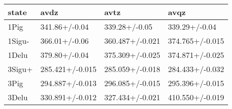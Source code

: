 \begin{tabular}{llll}
\toprule
state & avdz & avtz & avqz \\
\midrule
1Pig & 341.86+/-0.04 & 339.28+/-0.05 & 339.29+/-0.04 \\
1Sigu- & 366.01+/-0.06 & 360.487+/-0.021 & 374.765+/-0.015 \\
1Delu & 379.80+/-0.04 & 375.309+/-0.025 & 374.871+/-0.025 \\
3Sigu+ & 285.421+/-0.015 & 285.059+/-0.018 & 284.433+/-0.032 \\
3Pig & 294.887+/-0.013 & 296.085+/-0.015 & 295.396+/-0.015 \\
3Delu & 330.891+/-0.012 & 327.434+/-0.021 & 410.550+/-0.019 \\
\bottomrule
\end{tabular}
